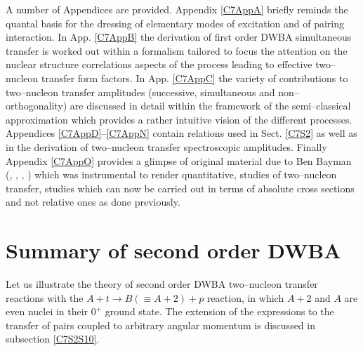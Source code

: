 A number of Appendices are provided. Appendix \ref{C7AppA} briefly reminds the quantal basis for the dressing of elementary modes of excitation and of pairing interaction. In  App. \ref{C7AppB} 	 the derivation of first order DWBA simultaneous transfer is worked out within a formalism tailored to focus the attention on the nuclear structure correlations aspects of the process leading to effective two--nucleon transfer form factors. In App. \ref{C7AppC}  the variety of  contributions to  two--nucleon transfer  amplitudes (successive, simultaneous and non--orthogonality) are discussed in detail within the framework of the semi--classical approximation which provides a rather intuitive vision of the different processes.  Appendices \ref{C7AppD}--\ref{C7AppN} contain relations used in Sect. \ref{C7S2} as well as in the derivation of two--nucleon transfer spectroscopic amplitudes. Finally Appendix \ref{C7AppO} provides a glimpse of original material due to Ben Bayman (\cite{Bayman:67}, \cite{Bayman:70}, \cite{Bayman:71}, \cite{Bayman:82}) which was instrumental to render quantitative, studies of two--nucleon transfer, studies which can now be carried out in terms of absolute cross sections and not relative ones as done previously.
\section{Summary of second order DWBA}\label{C7S1}
Let us illustrate the  theory of second order DWBA two--nucleon transfer reactions  with the  $A+t \rightarrow B(\equiv A+2)+p$ reaction, in which $A+2$ and $A$ are even nuclei in their $0^+$ ground state. The extension of the  expressions to the transfer of pairs coupled to arbitrary angular momentum is discussed in subsection \ref{C7S2S10}. 


